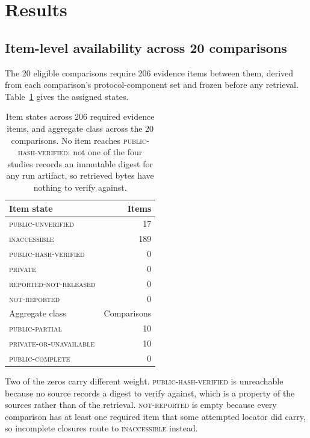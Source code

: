 \section{Results}
\label{sec:results}

\subsection{Item-level availability across 20 comparisons}
\label{sec:results:availability}

The 20 eligible comparisons require 206 evidence items between them, derived from each
comparison's protocol-component set and frozen before any retrieval. Table~\ref{tab:states}
gives the assigned states.

\begin{table}[t]
\caption{Item states across 206 required evidence items, and aggregate class across the 20
comparisons. No item reaches \textsc{public-hash-verified}: not one of the four studies
records an immutable digest for any run artifact, so retrieved bytes have nothing to verify
against.}
\label{tab:states}
\begin{tabular}{lr}
\toprule
Item state & Items \\
\midrule
\textsc{public-unverified} & 17 \\
\textsc{inaccessible} & 189 \\
\textsc{public-hash-verified} & 0 \\
\textsc{private} & 0 \\
\textsc{reported-not-released} & 0 \\
\textsc{not-reported} & 0 \\
\midrule
Aggregate class & Comparisons \\
\midrule
\textsc{public-partial} & 10 \\
\textsc{private-or-unavailable} & 10 \\
\textsc{public-complete} & 0 \\
\bottomrule
\end{tabular}
\end{table}

Two of the zeros carry different weight. \textsc{public-hash-verified} is unreachable
because no source records a digest to verify against, which is a property of the sources
rather than of the retrieval. \textsc{not-reported} is empty because every comparison has at
least one required item that some attempted locator did carry, so incomplete closures route
to \textsc{inaccessible} instead.

